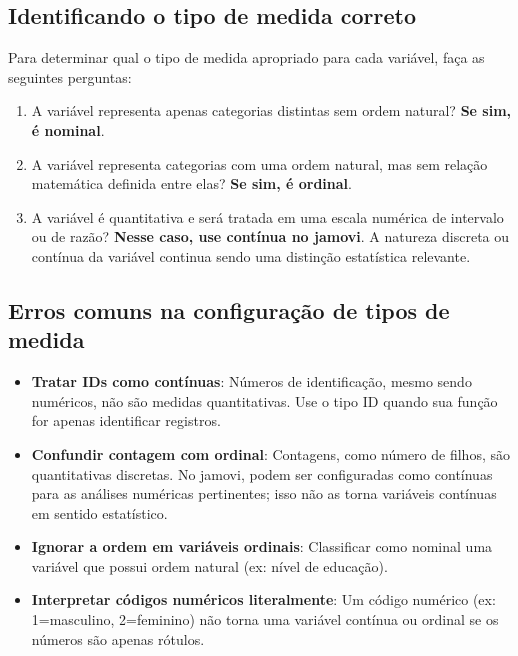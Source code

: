 
\subsection{Identificando o tipo de medida correto}

Para determinar qual o tipo de medida apropriado para cada variável, faça as seguintes perguntas:

\begin{enumerate}
    \item A variável representa apenas categorias distintas sem ordem natural? \textbf{Se sim, é nominal}.
    \item A variável representa categorias com uma ordem natural, mas sem relação matemática definida entre elas? \textbf{Se sim, é ordinal}.
    \item A variável é quantitativa e será tratada em uma escala numérica de intervalo ou de razão? \textbf{Nesse caso, use contínua no jamovi}. A natureza discreta ou contínua da variável continua sendo uma distinção estatística relevante.
\end{enumerate}

\subsection{Erros comuns na configuração de tipos de medida}

\begin{itemize}
    \item \textbf{Tratar IDs como contínuas}: Números de identificação, mesmo sendo numéricos, não são medidas quantitativas. Use o tipo ID quando sua função for apenas identificar registros.
    \item \textbf{Confundir contagem com ordinal}: Contagens, como número de filhos, são quantitativas discretas. No jamovi, podem ser configuradas como contínuas para as análises numéricas pertinentes; isso não as torna variáveis contínuas em sentido estatístico.
    \item \textbf{Ignorar a ordem em variáveis ordinais}: Classificar como nominal uma variável que possui ordem natural (ex: nível de educação).
    \item \textbf{Interpretar códigos numéricos literalmente}: Um código numérico (ex: 1=masculino, 2=feminino) não torna uma variável contínua ou ordinal se os números são apenas rótulos.
\end{itemize}

